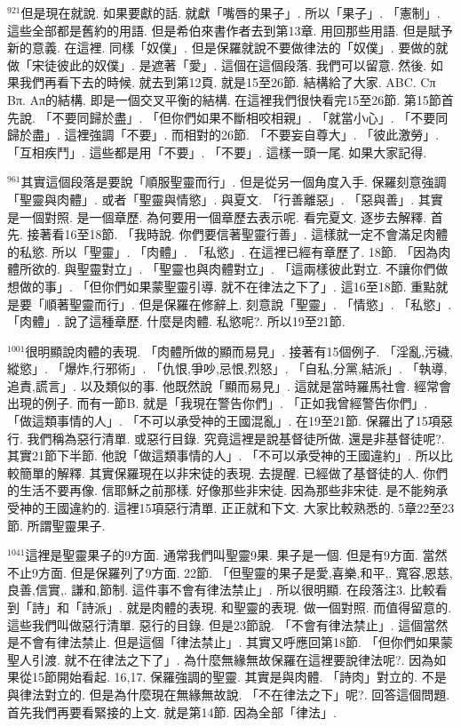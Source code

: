 \documentclass{book}
\begin{document}
$^{921}$但是現在就說.
如果要獻的話.
就獻「嘴唇的果子」.
所以「果子」.
「憲制」.
這些全部都是舊約的用語.
但是希伯來書作者去到第13章.
用回那些用語.
但是賦予新的意義.
在這裡.
同樣「奴僕」.
但是保羅就說不要做律法的「奴僕」.
要做的就做「宋徒彼此的奴僕」.
是遮著「愛」.
這個在這個段落.
我們可以留意.
然後.
如果我們再看下去的時候.
就去到第12頁.
就是15至26節.
結構給了大家.
ABC.
Cπ Bπ.
Aπ的結構.
即是一個交叉平衡的結構.
在這裡我們很快看完15至26節.
第15節首先說.
「不要同歸於盡」.
「但你們如果不斷相咬相親」.
「就當小心」.
「不要同歸於盡」.
這裡強調「不要」.
而相對的26節.
「不要妄自尊大」.
「彼此激勞」.
「互相疾鬥」.
這些都是用「不要」.
「不要」.
這樣一頭一尾.
如果大家記得.

$^{961}$其實這個段落是要說「順服聖靈而行」.
但是從另一個角度入手.
保羅刻意強調「聖靈與肉體」.
或者「聖靈與情慾」.
與夏文.
「行善離惡」.
「惡與善」.
其實是一個對照.
是一個章歷.
為何要用一個章歷去表示呢.
看完夏文.
逐步去解釋.
首先.
接著看16至18節.
「我時說.
你們要信著聖靈行善」.
這樣就一定不會滿足肉體的私慾.
所以「聖靈」.
「肉體」.
「私慾」.
在這裡已經有章歷了.
18節.
「因為肉體所欲的.
與聖靈對立」.
「聖靈也與肉體對立」.
「這兩樣彼此對立.
不讓你們做想做的事」.
「但你們如果蒙聖靈引導.
就不在律法之下了」.
這16至18節.
重點就是要「順著聖靈而行」.
但是保羅在修辭上.
刻意說「聖靈」.
「情慾」.
「私慾」.
「肉體」.
說了這種章歷.
什麼是肉體.
私慾呢?.
所以19至21節.

$^{1001}$很明顯說肉體的表現.
「肉體所做的顯而易見」.
接著有15個例子.
「淫亂,污穢,縱慾」.
「爆炸,行邪術」.
「仇恨,爭吵,忌恨,烈怒」.
「自私,分黨,結派」.
「執導,追責,謊言」.
以及類似的事.
他既然說「顯而易見」.
這就是當時羅馬社會.
經常會出現的例子.
而有一節B.
就是「我現在警告你們」.
「正如我曾經警告你們」.
「做這類事情的人」.
「不可以承受神的王國混亂」.
在19至21節.
保羅出了15項惡行.
我們稱為惡行清單.
或惡行目錄.
究竟這裡是說基督徒所做.
還是非基督徒呢?.
其實21節下半節.
他說「做這類事情的人」.
「不可以承受神的王國違約」.
所以比較簡單的解釋.
其實保羅現在以非宋徒的表現.
去提醒.
已經做了基督徒的人.
你們的生活不要再像.
信耶穌之前那樣.
好像那些非宋徒.
因為那些非宋徒.
是不能夠承受神的王國違約的.
這裡15項惡行清單.
正正就和下文.
大家比較熟悉的.
5章22至23節.
所謂聖靈果子.

$^{1041}$這裡是聖靈果子的9方面.
通常我們叫聖靈9果.
果子是一個.
但是有9方面.
當然不止9方面.
但是保羅列了9方面.
22節.
「但聖靈的果子是愛,喜樂,和平,.
寬容,恩慈,良善,信實,.
謙和,節制.
這件事不會有律法禁止」.
所以很明顯.
在段落注3.
比較看到「詩」和「詩派」.
就是肉體的表現.
和聖靈的表現.
做一個對照.
而值得留意的.
這些我們叫做惡行清單.
惡行的目錄.
但是23節說.
「不會有律法禁止」.
這個當然是不會有律法禁止.
但是這個「律法禁止」.
其實又呼應回第18節.
「但你們如果蒙聖人引渡.
就不在律法之下了」.
為什麼無緣無故保羅在這裡要說律法呢?.
因為如果從15節開始看起.
16,17.
保羅強調的聖靈.
其實是與肉體.
「詩肉」對立的.
不是與律法對立的.
但是為什麼現在無緣無故說.
「不在律法之下」呢?.
回答這個問題.
首先我們再要看緊接的上文.
就是第14節.
因為全部「律法」.
\end{document}

